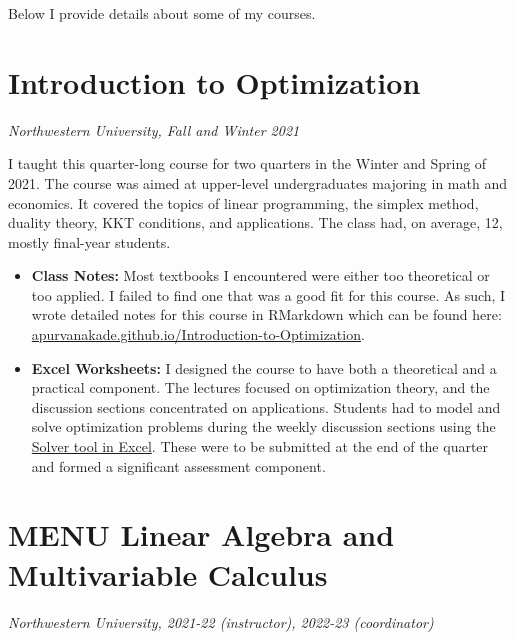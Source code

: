 \documentclass[
]{report}
\begin{document}
Below I provide details about some of my courses.

\hypertarget{introduction-to-optimization}{%
\section{Introduction to Optimization}\label{introduction-to-optimization}}

\emph{Northwestern University, Fall and Winter 2021}

I taught this quarter-long course for two quarters in the Winter and Spring of 2021.
The course was aimed at upper-level undergraduates majoring in math and economics.
It covered the topics of linear programming, the simplex method, duality theory, KKT conditions, and applications.
The class had, on average, 12, mostly final-year students.

\begin{itemize}
\item
  \textbf{Class Notes:}
  Most textbooks I encountered were either too theoretical or too applied.
  I failed to find one that was a good fit for this course.
  As such, I wrote detailed notes for this course in RMarkdown which can be found here: \href{https://apurvanakade.github.io/Introduction-to-Optimization/}{apurvanakade.github.io/Introduction-to-Optimization}.
\item
  \textbf{Excel Worksheets:}
  I designed the course to have both a theoretical and a practical component.
  The lectures focused on optimization theory, and the discussion sections concentrated on applications.
  Students had to model and solve optimization problems during the weekly discussion sections using the \href{https://support.microsoft.com/en-us/office/load-the-solver-add-in-in-excel-612926fc-d53b-46b4-872c-e24772f078ca}{Solver tool in Excel}.
  These were to be submitted at the end of the quarter and formed a significant assessment component.
\end{itemize}

\hypertarget{menu-linear-algebra-and-multivariable-calculus}{%
\section{MENU Linear Algebra and Multivariable Calculus}\label{menu-linear-algebra-and-multivariable-calculus}}

\emph{Northwestern University, 2021-22 (instructor), 2022-23 (coordinator)}
\end{document}
